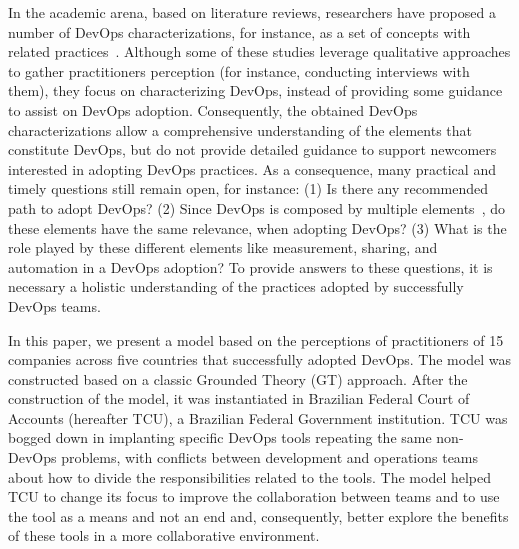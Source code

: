 In the academic arena, based on literature reviews, researchers have proposed a
number of DevOps characterizations, for instance, as a set of concepts with
related
practices~\cite{cooperation_dev_ops_esem_2014,devops_a_definition_xp_15,dimensions_of_devops_xp_15,extending_dimensions_icsea_16,characterizing_devops_sbes_2016,qualitative_devops_journalsw_17}. Although some
of these studies leverage qualitative approaches to gather practitioners perception (for instance,
conducting interviews with them), they focus on characterizing DevOps,
instead of providing some guidance to assist on DevOps adoption. Consequently,
the obtained DevOps characterizations allow a comprehensive understanding of
the elements that constitute DevOps, but do not provide detailed guidance to
support newcomers interested in adopting DevOps practices.
As a consequence, many practical and timely questions still remain open, for
instance: (1) Is there any recommended path to adopt DevOps? (2) Since
DevOps is composed by multiple elements~\cite{dimensions_of_devops_xp_15}, do
these elements have the same relevance, when adopting DevOps?
(3) What is the role played by these different elements like measurement, sharing, and automation
in a DevOps adoption? To provide answers to these questions, it is necessary a holistic
understanding of the practices adopted by successfully DevOps teams.

In this paper, we present a model based on the perceptions of practitioners of
15 companies across five countries that successfully adopted DevOps. The model
was constructed based on a classic Grounded Theory (GT) approach. After the
construction of the model, it was instantiated in Brazilian Federal Court of
Accounts (hereafter TCU), a Brazilian Federal Government institution. TCU was
bogged down in implanting specific DevOps tools repeating the same non-DevOps
problems, with conflicts between development and operations teams about how to
divide the responsibilities related to the tools. The model helped TCU to
change its focus to improve the collaboration between teams and to use the tool
as a means and not an end and, consequently, better explore the benefits of
these tools in a more collaborative environment.


